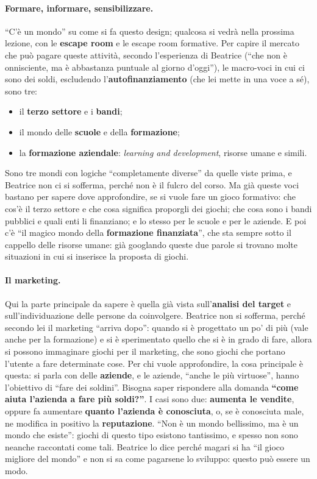 \paragraph{Formare, informare, sensibilizzare.} ``C'è un mondo'' su come si fa questo
design; qualcosa si vedrà nella prossima lezione, con le \textbf{escape room} e le
escape room formative. Per capire il mercato che può pagare queste attività, secondo
l'esperienza di Beatrice (``che non è onnisciente, ma è abbastanza puntuale al giorno
d'oggi''), le macro-voci in cui ci sono dei soldi, escludendo
l'\textbf{autofinanziamento} (che lei mette in una voce a sé), sono tre:
\begin{itemize}
  \item il \textbf{terzo settore} e i \textbf{bandi};
  \item il mondo delle \textbf{scuole} e della \textbf{formazione};
  \item la \textbf{formazione aziendale}: \emph{learning and development}, risorse
        umane e simili.
\end{itemize}
Sono tre mondi con logiche ``completamente diverse'' da quelle viste prima, e
Beatrice non ci si sofferma, perché non è il fulcro del corso. Ma già queste voci
bastano per sapere dove approfondire, se si vuole fare un gioco formativo: che cos'è
il terzo settore e che cosa significa proporgli dei giochi; che cosa sono i bandi
pubblici e quali enti li finanziano; e lo stesso per le scuole e per le aziende. E
poi c'è ``il magico mondo della \textbf{formazione finanziata}'', che sta sempre
sotto il cappello delle risorse umane: già googlando queste due parole si trovano
molte situazioni in cui si inserisce la proposta di giochi.

\paragraph{Il marketing.} Qui la parte principale da sapere è quella già vista
sull'\textbf{analisi del target} e sull'individuazione delle persone da coinvolgere.
Beatrice non si sofferma, perché secondo lei il marketing ``arriva dopo'': quando si
è progettato un po' di più (vale anche per la formazione) e si è sperimentato quello
che si è in grado di fare, allora si possono immaginare giochi per il marketing, che
sono giochi che portano l'utente a fare determinate cose. Per chi vuole approfondire,
la cosa principale è questa: si parla con delle \textbf{aziende}, e le aziende,
``anche le più virtuose'', hanno l'obiettivo di ``fare dei soldini''. Bisogna saper
rispondere alla domanda \textbf{``come aiuta l'azienda a fare più soldi?''}. I casi
sono due: \textbf{aumenta le vendite}, oppure fa aumentare \textbf{quanto l'azienda è
conosciuta}, o, se è conosciuta male, ne modifica in positivo la
\textbf{reputazione}. ``Non è un mondo bellissimo, ma è un mondo che esiste'': giochi
di questo tipo esistono tantissimo, e spesso non sono neanche raccontati come tali.
Beatrice lo dice perché magari si ha ``il gioco migliore del mondo'' e non si sa come
pagarsene lo sviluppo: questo può essere un modo.

